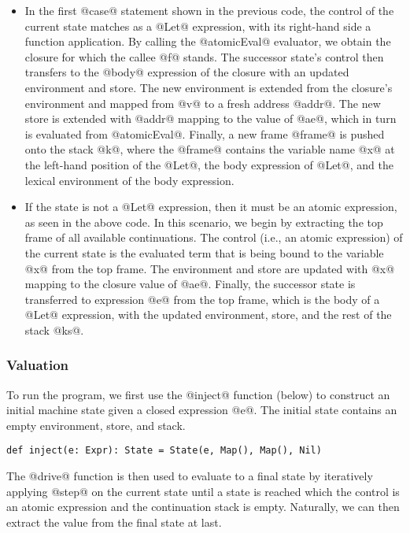 \documentclass[acmsmall]{acmart}\settopmatter{}
\begin{document}
\begin{itemize}

\item In the first @case@ statement shown in the previous code, the control of the current 
  state matches as a @Let@ expression, with its right-hand side a function application.
  By calling the @atomicEval@ evaluator, we obtain the closure for which the callee @f@ stands.
  The successor state's control then transfers to the @body@ expression of the closure with 
  an updated environment and store. The new environment is extended from the closure's 
  environment and mapped from @v@ to a fresh address @addr@. The new store is extended with
  @addr@ mapping to the value of @ae@, which in turn is evaluated from @atomicEval@.
  Finally, a new frame @frame@ is pushed onto the stack @k@, where the @frame@ contains 
  the variable name @x@ at the left-hand position of the @Let@, the body expression of 
  @Let@, and the lexical environment of the body expression.

\item If the state is not a @Let@ expression, then it must be an atomic expression, as seen
  in the above code. In this scenario, we begin by extracting the top frame of all available
  continuations. The control (i.e., an atomic expression) of the current state is the 
  evaluated term that is being bound to the variable @x@ from the top frame.
  The environment and store are updated with @x@ mapping to the closure value of @ae@.
  Finally, the successor state is transferred to expression @e@ from the top frame,
  which is the body of a @Let@ expression, with the updated environment, store, and
  the rest of the stack @ks@.

\end{itemize}

\subsubsection{Valuation}

To run the program, we first use the @inject@ function (below) to construct an initial 
machine state given a closed expression @e@. The initial state contains an empty environment,
store, and stack.
\begin{lstlisting}
def inject(e: Expr): State = State(e, Map(), Map(), Nil)
\end{lstlisting}

The @drive@ function is then used to evaluate to a final state by iteratively applying 
@step@ on the current state until a state is reached which the control is an atomic 
expression and the continuation stack is empty. Naturally, we can then extract the value
from the final state at last.
\end{document}
